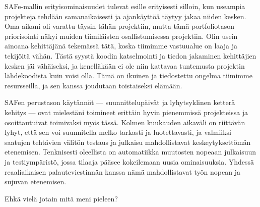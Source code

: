 \documentclass{article}
\begin{document}
SAFe-mallin erityisominaisuudet tulevat esille erityisesti silloin, kun
useampia projekteja tehdään samanaikai\-sesti ja ajankäyttöä täytyy jakaa
niiden kesken. Oma aikani oli varattu täysin tähän projektiin, mutta tämä
portfoliotason priorisointi näkyi muiden tiimiläisten osallistumisessa
projektiin. Olin usein ainoana kehittäjänä tekemässä tätä, koska tiimimme
vastuualue on laaja ja tekijöitä vähän. Tästä syystä koodin katselmointi ja
tiedon jakaminen kehittäjien kesken jäi vähäiseksi, ja kenelläkään ei ole niin
kattavaa tuntemusta projektin lähdekoodista kuin voisi olla. Tämä on ikuinen ja
tiedostettu ongelma tiimimme resursseilla, ja sen kanssa joudutaan toistaiseksi
elämään.

SAFen perustason käytännöt — suunnittelupäivät ja lyhytsyklinen ketterä kehitys
— ovat mielestäni toimineet erittäin hyvin pienemmissä projekteissa ja
osoittautuivat toimivaksi myös tässä. Kolmen kuukauden aikaväli on riittävän
lyhyt, että sen voi suunnitella melko tarkasti ja luotettavasti, ja valmiiksi
saatujen tehtävien välitön testaus ja julkaisu mahdollistavat keskeytyksettömän
etenemisen. Tenknisesti oleellista on automatiikka muutosten nopeaan julkaisuun
ja testiympäristö, jossa tilaaja pääsee kokeilemaan uusia ominaisuuksia.
Yhdessä reaaliaikaisen palauteviestinnän kanssa nämä mahdollistavat työn nopean
ja sujuvan etenemisen.

Ehkä vielä jotain mitä meni pieleen?
\end{document}
